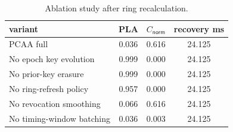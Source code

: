 \begin{table}[htbp]
\centering
\caption{Ablation study after ring recalculation.}
\label{tab:ablation}
\begin{tabular}{@{}lccc@{}}
\toprule
variant & PLA & $C_{\mathsf{norm}}$ & recovery ms \\
\midrule
PCAA full & 0.036 & 0.616 & 24.125 \\
No epoch key evolution & 0.999 & 0.000 & 24.125 \\
No prior-key erasure & 0.999 & 0.000 & 24.125 \\
No ring-refresh policy & 0.957 & 0.000 & 24.125 \\
No revocation smoothing & 0.066 & 0.616 & 24.125 \\
No timing-window batching & 0.036 & 0.003 & 24.125 \\
\bottomrule
\end{tabular}
\end{table}
